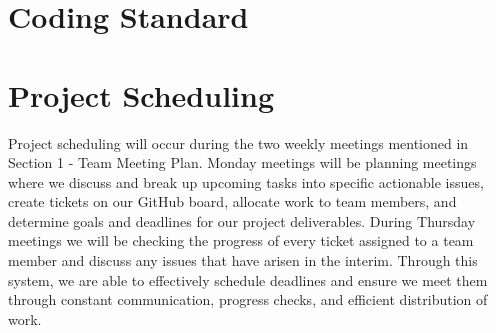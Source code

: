 \documentclass{article}
\begin{document}
\section{Coding Standard}

\section{Project Scheduling}

Project scheduling will occur during the two weekly meetings mentioned in Section 1 - Team Meeting Plan. Monday meetings will be planning meetings where we discuss and break up upcoming tasks into specific actionable issues, create tickets on our GitHub board, allocate work to team members, and determine goals and deadlines for our project deliverables. During Thursday meetings we will be checking the progress of every ticket assigned to a team member and discuss any issues that have arisen in the interim. Through this system, we are able to effectively schedule deadlines and ensure we meet them through constant communication, progress checks, and efficient distribution of work.
\end{document}
